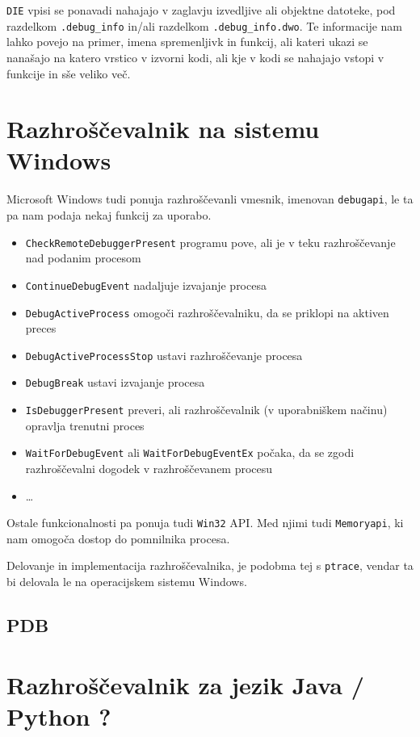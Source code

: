\documentclass[a4paper,notitlepage]{article}
\newcommand{\code}[1]{\texttt{#1}}
\begin{document}
\code{DIE} vpisi se ponavadi nahajajo v zaglavju izvedljive ali objektne datoteke, pod razdelkom \code{.debug_info} in/ali razdelkom \code{.debug_info.dwo}.
Te informacije nam lahko povejo na primer, imena spremenljivk in funkcij, ali kateri ukazi se nanašajo na katero vrstico v izvorni kodi, ali kje v kodi se nahajajo vstopi v funkcije in sše veliko več.

\section{Razhroščevalnik na sistemu Windows}

Microsoft Windows tudi ponuja razhroščevanli vmesnik, imenovan \code{debugapi}\cite{win32-debugapi}, le ta pa nam podaja nekaj funkcij za uporabo.

\begin{itemize}
    \item \code{CheckRemoteDebuggerPresent} programu pove, ali je v teku razhroščevanje nad podanim procesom
    \item \code{ContinueDebugEvent} nadaljuje izvajanje procesa
    \item \code{DebugActiveProcess} omogoči razhroščevalniku, da se priklopi na aktiven preces
    \item \code{DebugActiveProcessStop} ustavi razhroščevanje procesa
    \item \code{DebugBreak} ustavi izvajanje procesa
    \item \code{IsDebuggerPresent} preveri, ali razhroščevalnik (v uporabniškem načinu) opravlja trenutni proces
    \item \code{WaitForDebugEvent} ali \code{WaitForDebugEventEx} počaka, da se zgodi razhroščevalni dogodek v razhroščevanem procesu
    \item \ldots
\end{itemize}

Ostale funkcionalnosti pa ponuja tudi \code{Win32} API\cite{win32-api}. Med njimi tudi \code{Memoryapi}\cite{win32-memapi}, ki nam omogoča dostop do pomnilnika procesa.

Delovanje in implementacija razhroščevalnika, je podobma tej s \code{ptrace}, vendar ta bi delovala le na operacijskem sistemu Windows.

\subsection{PDB}

\section{Razhroščevalnik za jezik Java / Python ?}

\nocite{*} %


\end{document}
